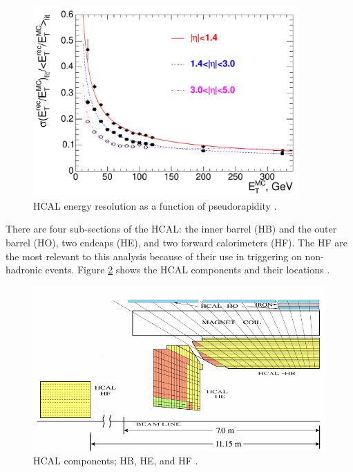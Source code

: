 \begin{figure}[]
\begin{centering}
\includegraphics[width=4in]{Chapter3/importfigs/Figure_001-008.pdf}
\par\end{centering}
\caption{HCAL energy resolution as a function of pseudorapidity \cite{Bayatian:2006nff}. \label{fig:hcalRes}}
\end{figure}

There are four sub-sections of the HCAL: the inner barrel (HB) and the outer barrel (HO), two endcaps (HE), and two forward calorimeters (HF). The HF are the most relevant to this analysis because of their use in triggering on non-hadronic events. Figure \ref{fig:hcalComp} shows the HCAL components and their locations \cite{Bayatian:2006nff}.

\begin{figure}[]
\begin{centering}
\includegraphics[width=5in]{Chapter3/importfigs/filtering_noise_in_CMS_hadron_calorimeter.png}
\par\end{centering}
\caption{HCAL components; HB, HE, and HF \cite{Bayatian:2006nff}. \label{fig:hcalComp}}
\end{figure}



